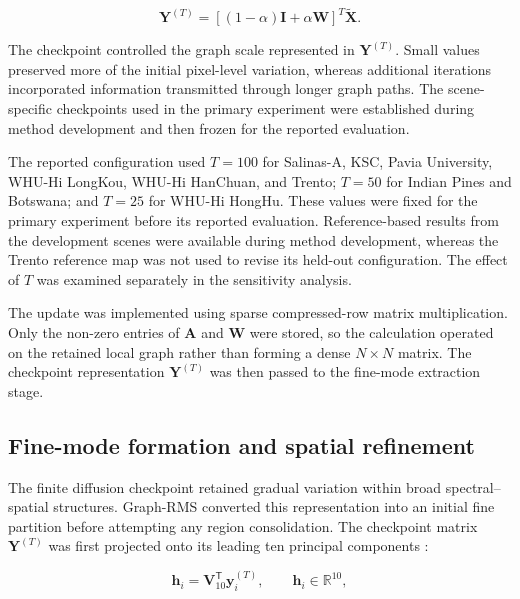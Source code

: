 \documentclass[10pt,a4paper,fleqn]{article}
\begin{document}
\begin{equation}
\mathbf{Y}^{(T)}
=
\left[
(1-\alpha)\mathbf{I}
+
\alpha\mathbf{W}
\right]^{T}
\widetilde{\mathbf{X}}.
\label{eq:checkpoint_representation}
\end{equation}

The checkpoint controlled the graph scale represented in
\(\mathbf{Y}^{(T)}\). Small values preserved more of the initial pixel-level
variation, whereas additional iterations incorporated information transmitted
through longer graph paths. The scene-specific checkpoints used in the
primary experiment were established during method development and then frozen
for the reported evaluation.

The reported configuration used \(T=100\) for Salinas-A, KSC, Pavia
University, WHU-Hi LongKou, WHU-Hi HanChuan, and Trento; \(T=50\) for Indian
Pines and Botswana; and \(T=25\) for WHU-Hi HongHu. These values were fixed for the primary experiment before its reported
evaluation. Reference-based results from the development scenes were available
during method development, whereas the Trento reference map was not used to
revise its held-out configuration. The effect of \(T\) was examined separately
in the sensitivity analysis.

The update was implemented using sparse compressed-row matrix multiplication.
Only the non-zero entries of \(\mathbf{A}\) and \(\mathbf{W}\) were stored, so
the calculation operated on the retained local graph rather than forming a
dense \(N\times N\) matrix. The checkpoint representation
\(\mathbf{Y}^{(T)}\) was then passed to the fine-mode extraction stage.

\subsection{Fine-mode formation and spatial refinement}
\label{subsec:fine_modes}

The finite diffusion checkpoint retained gradual variation within broad
spectral--spatial structures. Graph-RMS converted this representation into an
initial fine partition before attempting any region consolidation. The
checkpoint matrix \(\mathbf{Y}^{(T)}\) was first projected onto its leading ten
principal components \citep{jolliffe2016}:

\begin{equation}
\mathbf{h}_i
=
\mathbf{V}_{10}^{\mathsf T}
\mathbf{y}_i^{(T)},
\qquad
\mathbf{h}_i\in\mathbb{R}^{10},
\label{eq:fine_pca}
\end{equation}
\end{document}
